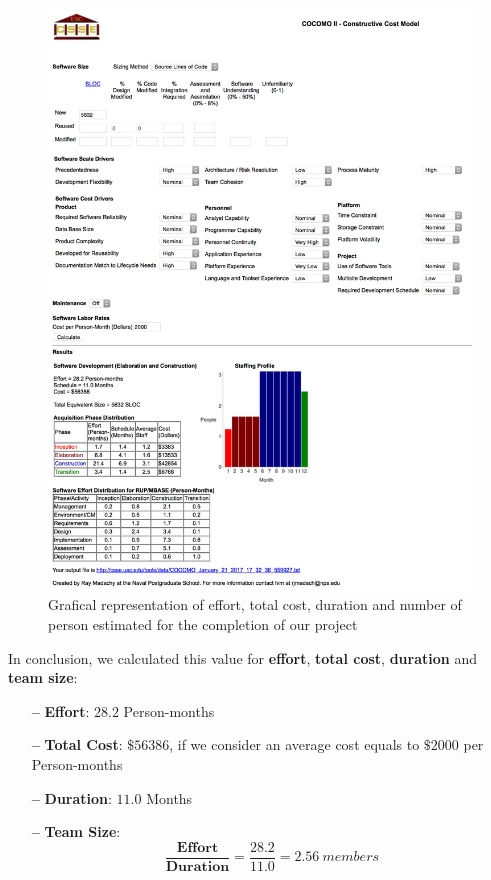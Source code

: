 \begin{figure}[htbp]
\centering
\includegraphics[width=\textwidth]{Images/cocomo_v1}
\caption{Grafical representation of effort, total cost, duration and number of person estimated for the completion of our project}
\label{fig:chart}
\end{figure}

\clearpage

In conclusion, we calculated this value for \textbf{effort}, \textbf{total cost}, \textbf{duration} and \textbf{team size}:

\begin{itemize}

\item[\textbf{--}] \textbf{Effort}: $28.2$ Person-months
\item[\textbf{--}] \textbf{Total Cost}: $\$56386$, if we consider an average cost equals to $\$2000$ per Person-months
\item[\textbf{--}] \textbf{Duration}: $11.0$ Months
\item[\textbf{--}] \textbf{Team Size}: \[\frac{\textbf{Effort}}{\textbf{Duration}} = \frac{28.2}{11.0} = 2.56\:members\] 

\end{itemize}
